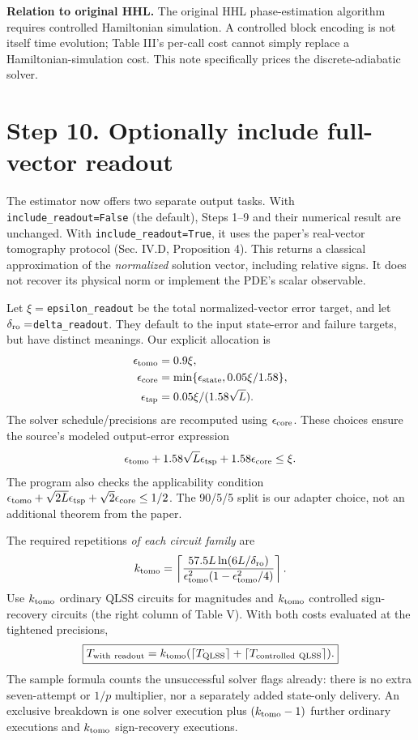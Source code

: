 \documentclass[11pt]{article}
\newcommand{\ceil}[1]{\left\lceil#1\right\rceil}
\begin{document}
\textbf{Relation to original HHL.} The original HHL phase-estimation algorithm requires controlled Hamiltonian simulation. A controlled block encoding is not itself time evolution; Table III's per-call cost cannot simply replace a Hamiltonian-simulation cost. This note specifically prices the discrete-adiabatic solver.


\newpage
\section*{Step 10. Optionally include full-vector readout}
The estimator now offers two separate output tasks. With \texttt{include\_readout=False} (the default), Steps 1--9 and their numerical result are unchanged. With \texttt{include\_readout=True}, it uses the paper's real-vector tomography protocol (Sec. IV.D, Proposition 4). This returns a classical approximation of the \emph{normalized} solution vector, including relative signs. It does not recover its physical norm or implement the PDE's scalar observable.

Let $\xi=$\texttt{epsilon\_readout} be the total normalized-vector error target, and let $\delta_{\rm ro}=$\texttt{delta\_readout}. They default to the input state-error and failure targets, but have distinct meanings. Our explicit allocation is
\begin{align*}
 \epsilon_{\rm tomo}&=0.9\xi,\\
 \epsilon_{\rm core}&=\min\{\epsilon_{\rm state},0.05\xi/1.58\},\\
 \epsilon_{\rm tsp}&=0.05\xi/(1.58\sqrt L).
\end{align*}
The solver schedule/precisions are recomputed using $\epsilon_{\rm core}$. These choices ensure the source's modeled output-error expression
\[
 \epsilon_{\rm tomo}+1.58\sqrt L\epsilon_{\rm tsp}
                      +1.58\epsilon_{\rm core}\le\xi.
\]
The program also checks the applicability condition
$\epsilon_{\rm tomo}+\sqrt{2L}\epsilon_{\rm tsp}+\sqrt2\epsilon_{\rm core}\le1/2$.
The 90/5/5 split is our adapter choice, not an additional theorem from the paper.

The required repetitions \emph{of each circuit family} are
\[
 k_{\rm tomo}=\left\lceil\frac{57.5L\ln(6L/\delta_{\rm ro})}
 {\epsilon_{\rm tomo}^2(1-\epsilon_{\rm tomo}^2/4)}\right\rceil.
\]
Use $k_{\rm tomo}$ ordinary QLSS circuits for magnitudes and $k_{\rm tomo}$ controlled sign-recovery circuits (the right column of Table V). With both costs evaluated at the tightened precisions,
\[
 \boxed{T_{\rm with\ readout}=k_{\rm tomo}
 (\ceil{T_{\rm QLSS}}+\ceil{T_{\rm controlled\ QLSS}}).}
\]
The sample formula counts the unsuccessful solver flags already: there is no extra seven-attempt or $1/p$ multiplier, nor a separately added state-only delivery. An exclusive breakdown is one solver execution plus $(k_{\rm tomo}-1)$ further ordinary executions and $k_{\rm tomo}$ sign-recovery executions.
\end{document}
